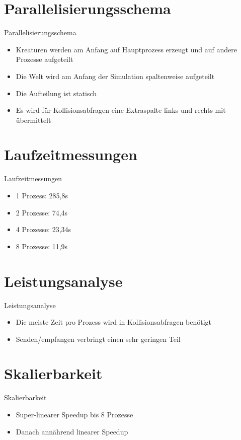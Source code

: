 \documentclass{beamer}
\begin{document}
\section{Parallelisierungsschema}
\begin{frame}{Parallelisierungsschema}
\begin{itemize}
	\item Kreaturen werden am Anfang auf Hauptprozess erzeugt und auf andere Prozesse aufgeteilt
    \item Die Welt wird am Anfang der Simulation spaltenweise aufgeteilt
    \item Die Aufteilung ist statisch
    \item Es wird für Kollisionsabfragen eine Extraspalte links und rechts mit übermittelt
\end{itemize}
\end{frame}


\section{Laufzeitmessungen}
\begin{frame}{Laufzeitmessungen}
\begin{itemize}
	\item 1 Prozess:  285,8s
	\item 2 Prozesse: 74,4s
	\item 4 Prozesse: 23,34s
	\item 8 Prozesse: 11,9s
\end{itemize}
\end{frame}


\section{Leistungsanalyse}
\begin{frame}{Leistungsanalyse}
\begin{itemize}
    \item Die meiste Zeit pro Prozess wird in Kollisionsabfragen benötigt
    \item Senden/empfangen verbringt einen sehr geringen Teil
\end{itemize}
\end{frame}


\section{Skalierbarkeit}
\begin{frame}{Skalierbarkeit}
\begin{itemize}
    \item Super-linearer Speedup bis 8 Prozesse
    \item Danach annährend linearer Speedup
\end{itemize}
\end{frame}
\end{document}

